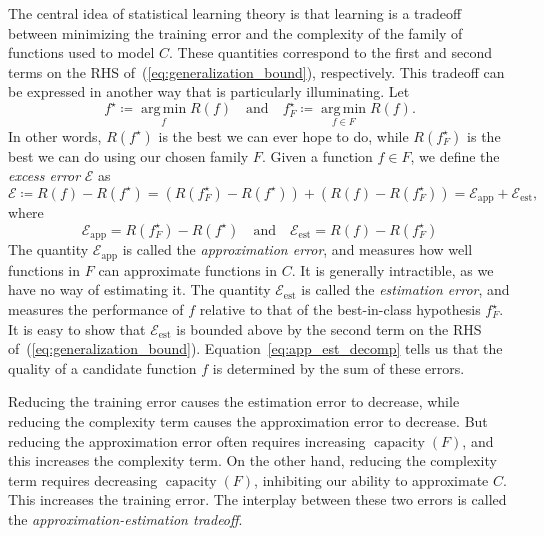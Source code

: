\documentclass[11pt,a4paper]{article}
\numberwithin{equation}{section}
\newcommand{\capacity}{\operatorname{capacity}}
\newcommand{\apperr}{\mathcal{E}_{\mathrm{app}}}
\newcommand{\esterr}{\mathcal{E}_{\mathrm{est}}}
\newcommand{\argmin}{\operatorname*{arg\,min}}
\begin{document}
The central idea of statistical learning theory is that learning is a tradeoff
between minimizing the training error and the complexity of the family of
functions used to model $C$. These quantities correspond to the first and second
terms on the RHS of~(\ref{eq:generalization_bound}), respectively. This tradeoff
can be expressed in another way that is particularly illuminating. Let
\[
	f^\star \coloneqq \argmin_{f} R(f) \quad\text{and}\quad
	f_F^\star \coloneqq \argmin_{f \in F} R(f).
\]
In other words, $R(f^\star)$ is the best we can ever hope to do, while
$R(f_F^\star)$ is the best we can do using our chosen family $F$. Given a
function $f \in F$, we define the \emph{excess error} $\mathcal{E}$ as
\begin{equation}
	\mathcal{E} \coloneqq R(f) - R(f^\star)
		= (R(f_F^\star) - R(f^\star)) + (R(f) - R(f_F^\star))
		= \apperr + \esterr,
	\label{eq:app_est_decomp}
\end{equation}
where
\[
	\apperr = R(f_F^\star) - R(f^\star)
	\quad\text{and}\quad
	\esterr = R(f) - R(f_F^\star)
\]
The quantity $\apperr$ is called the \emph{approximation error}, and measures
how well functions in $F$ can approximate functions in $C$. It is generally
intractible, as we have no way of estimating it. The quantity $\esterr$ is
called the \emph{estimation error}, and measures the performance of $f$ relative
to that of the best-in-class hypothesis $f_F^\star$. It is easy to show that
$\esterr$ is bounded above by the second term on the RHS
of~(\ref{eq:generalization_bound}). Equation~\ref{eq:app_est_decomp} tells us
that the quality of a candidate function $f$ is determined by the sum of these
errors.

Reducing the training error causes the estimation error to decrease, while
reducing the complexity term causes the approximation error to decrease. But
reducing the approximation error often requires increasing $\capacity(F)$, and
this increases the complexity term. On the other hand, reducing the complexity
term requires decreasing $\capacity(F)$, inhibiting our ability to approximate
$C$. This increases the training error. The interplay between these two errors
is called the \emph{approximation-estimation tradeoff}.
\end{document}
